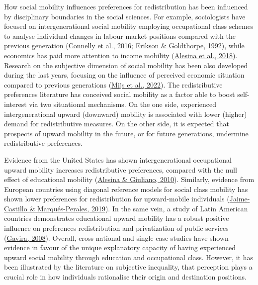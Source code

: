 \documentclass[
  12pt,
]{book}
\begin{document}
How social mobility influences preferences for redistribution has been influenced by disciplinary boundaries in the social sciences. For example, sociologists have focused on intergenerational social mobility employing occupational class schemes to analyse individual changes in labour market positions compared with the previous generation (\protect\hyperlink{ref-Connelly2016}{Connelly et al., 2016}; \protect\hyperlink{ref-Erikson1992}{Erikson \& Goldthorpe, 1992}), while economics has paid more attention to income mobility (\protect\hyperlink{ref-alesina_intergenerational_2018}{Alesina et al., 2018}). Research on the subjective dimension of social mobility has been also developed during the last years, focusing on the influence of perceived economic situation compared to previous generations (\protect\hyperlink{ref-mijs_belief_2022}{Mijs et al., 2022}). The redistributive preferences literature has conceived social mobility as a factor able to boost self-interest via two situational mechanisms. On the one side, experienced intergenerational upward (downward) mobility is associated with lower (higher) demand for redistributive measures. On the other side, it is expected that prospects of upward mobility in the future, or for future generations, undermine redistributive preferences.

Evidence from the United States has shown intergenerational occupational upward mobility increases redistributive preferences, compared with the null effect of educational mobility (\protect\hyperlink{ref-alesina_preferences_2010}{Alesina \& Giuliano, 2010}). Similarly, evidence from European countries using diagonal reference models for social class mobility has shown lower preferences for redistribution for upward-mobile individuals (\protect\hyperlink{ref-jaime-castillo_social_2019}{Jaime-Castillo \& Marqués-Perales, 2019}). In the same vein, a study of Latin American countries demonstrates educational upward mobility has a robust positive influence on preferences redistribution and privatization of public services (\protect\hyperlink{ref-gavira_social_2008}{Gavira, 2008}). Overall, cross-national and single-case studies have shown evidence in favour of the unique explanatory capacity of having experienced upward social mobility through education and occupational class. However, it has been illustrated by the literature on subjective inequality, that perception plays a crucial role in how individuals rationalise their origin and destination positions.
\end{document}
